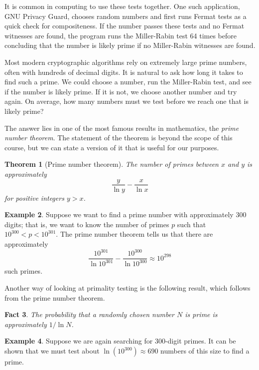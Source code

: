 \documentclass{book}
\theoremstyle{plain}
\newtheorem{theorem}{Theorem}[chapter]
\newtheorem{fact}[theorem]{Fact}
\theoremstyle{definition}
\newtheorem{example}[theorem]{Example}
\begin{document}
It is common in computing to use these tests together. One such application, GNU Privacy Guard, chooses random numbers and first runs Fermat tests as a quick check for compositeness. If the number passes these tests and no Fermat witnesses are found, the program runs the Miller-Rabin test 64 times before concluding that the number is likely prime if no Miller-Rabin witnesses are found.

Most modern cryptographic algorithms rely on extremely large prime numbers, often with hundreds of decimal digits. It is natural to ask how long it takes to find such a prime. We could choose a number, run the Miller-Rabin test, and see if the number is likely prime. If it is not, we choose another number and try again. On average, how many numbers must we test before we reach one that is likely prime?

The answer lies in one of the most famous results in mathematics, the {\it prime number theorem}. The statement of the theorem is beyond the scope of this course, but we can state a version of it that is useful for our purposes.

\begin{theorem}[Prime number theorem]
The number of primes between $x$ and $y$ is approximately $$\frac{y}{\ln y} - \frac{x}{\ln x}$$ for positive integers $y > x$.
\end{theorem}

\begin{example}
Suppose we want to find a prime number with approximately 300 digits; that is, we want to know the number of primes $p$ such that $10^{300} < p < 10^{301}$. The prime number theorem tells us that there are approximately $$\frac{10^{301}}{\ln 10^{301}} - \frac{10^{300}}{\ln 10^{300}} \approx 10^{298}$$ such primes.
\end{example}

Another way of looking at primality testing is the following result, which follows from the prime number theorem.

\begin{fact}
The probability that a randomly chosen number $N$ is prime is approximately $1/\ln N$.
\end{fact}

\begin{example}
Suppose we are again searching for $300$-digit primes. It can be shown that we must test about $\ln(10^{300}) \approx 690$ numbers of this size to find a prime.
\end{example}
\end{document}
